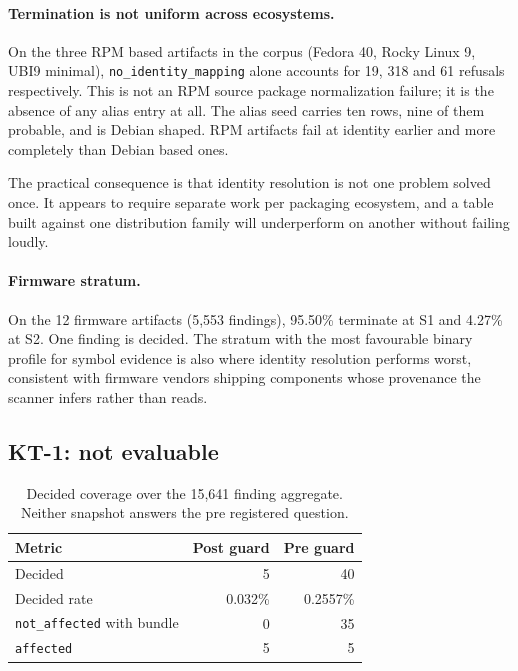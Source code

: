 \paragraph{Termination is not uniform across ecosystems.} On the three RPM based
artifacts in the corpus (Fedora 40, Rocky Linux 9, UBI9 minimal),
\texttt{no\_identity\_mapping} alone accounts for 19, 318 and 61 refusals
respectively. This is not an RPM source package normalization failure; it is the
absence of any alias entry at all. The alias seed carries ten rows, nine of them
probable, and is Debian shaped. RPM artifacts fail at identity earlier and more
completely than Debian based ones.

The practical consequence is that identity resolution is not one problem solved
once. It appears to require separate work per packaging ecosystem, and a table
built against one distribution family will underperform on another without
failing loudly.

\paragraph{Firmware stratum.} On the 12 firmware artifacts (5,553 findings),
95.50\% terminate at S1 and 4.27\% at S2. One finding is decided. The stratum
with the most favourable binary profile for symbol evidence is also where
identity resolution performs worst, consistent with firmware vendors shipping
components whose provenance the scanner infers rather than reads.

\subsection{KT-1: not evaluable}
\label{sec:kt1}

\begin{table}[t]
\caption{Decided coverage over the 15,641 finding aggregate. Neither snapshot
answers the pre registered question.}
\label{tab:kt1}
\centering
\begin{tabular}{@{}lrr@{}}
\toprule
Metric & Post guard & Pre guard \\
\midrule
Decided & 5 & 40 \\
Decided rate & 0.032\% & 0.2557\% \\
\texttt{not\_affected} with bundle & 0 & 35 \\
\texttt{affected} & 5 & 5 \\
\bottomrule
\end{tabular}
\end{table}

